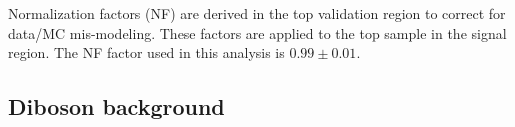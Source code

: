 %
%
%


Normalization factors (NF) are derived in the top validation region to correct for data/MC mis-modeling. These factors are applied to the top sample in the signal region. The NF factor used in this analysis is $0.99\pm0.01$. 

\subsection{Diboson background}

